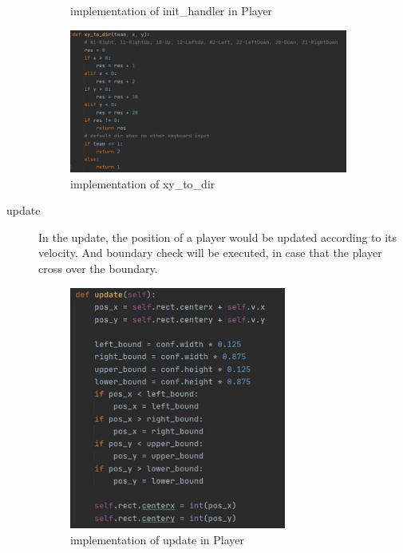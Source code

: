 \documentclass[14pt]{extarticle}
\begin{document}
\begin{description}
\begin{figure}[H]
\begin{center}
			\caption{implementation of init\_handler in Player}
		\end{center}
	\end{figure}
	\begin{figure}[H]
	\begin{center}
			\includegraphics[width=0.9\textwidth]{xy_to_dir}
			\caption{implementation of xy\_to\_dir}
		\end{center}
	\end{figure}
	\item[update]
	In the update, the position of a player would be updated according to its velocity. And boundary check will be executed, in case that the player cross over the boundary. 
	\begin{figure}[H]
		\begin{center}
			\includegraphics[width=0.7\textwidth]{Player_update}
			\caption{implementation of update in Player}
		\end{center}
	\end{figure}

\end{description}
\end{document}
